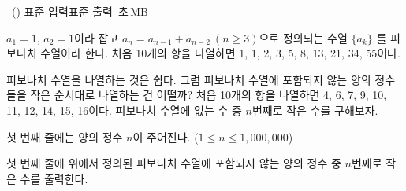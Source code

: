 \begin{problem}{\kcpcpprobnotfibo\ (\kcpcpprobnotfiboshort)}
    {표준 입력}{표준 출력}
    {\kcpcpprobnotfibotime\,초}{\kcpcpprobnotfibomemory\,MB}{}
    
    $ a_1 = 1 $, $ a_2 = 1 $이라 잡고 $ a_n = a_{n-1} + a_{n-2}\ (n \geq 3) $으로 정의되는 수열 $ \{a_k\} $ 를 피보나치 수열이라 한다. 처음 10개의 항을 나열하면 1, 1, 2, 3, 5, 8, 13, 21, 34, 55이다.
    
    피보나치 수열을 나열하는 것은 쉽다. 그럼 피보나치 수열에 포함되지 않는 양의 정수들을 작은 순서대로 나열하는 건 어떨까? 처음 10개의 항을 나열하면 4, 6, 7, 9, 10, 11, 12, 14, 15, 16이다. 피보나치 수열에 없는 수 중 $ n $번째로 작은 수를 구해보자.
    
    \InputFile
    
    첫 번째 줄에는 양의 정수 $ n $이 주어진다. ($ 1 \leq n \leq 1,000,000 $)
    
    \OutputFile
    
    첫 번째 줄에 위에서 정의된 피보나치 수열에 포함되지 않는 양의 정수 중 $ n $번째로 작은 수를 출력한다.
    
    \Examples
    \begin{example}
    \end{example}
    
\end{problem}

